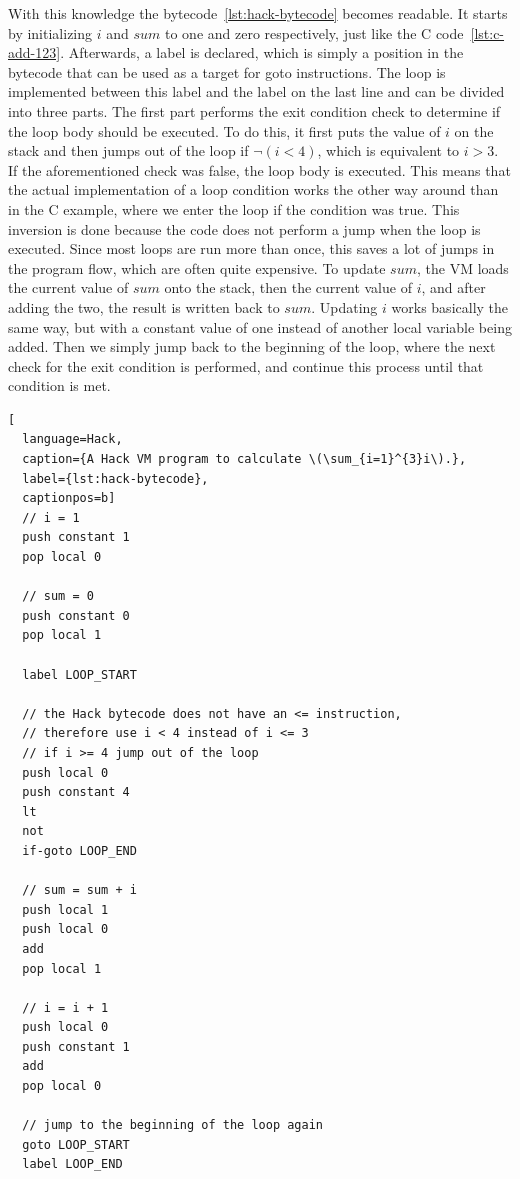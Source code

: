 With this knowledge the bytecode~\ref{lst:hack-bytecode} becomes readable.
It starts by initializing \(i\) and \(sum\) to one and zero respectively, just like the C code~\ref{lst:c-add-123}.
Afterwards, a label is declared, which is simply a position in the bytecode that can be used as a target for goto instructions.
The loop is implemented between this label and the label on the last line and can be divided into three parts.
The first part performs the exit condition check to determine if the loop body should be executed.
To do this, it first puts the value of \(i\) on the stack and then jumps out of the loop if \(\neg(i < 4)\), which is equivalent to \(i > 3\).
If the aforementioned check was false, the loop body is executed.
This means that the actual implementation of a loop condition works the other way around than in the C example, where we enter the loop if the condition was true.
This inversion is done because the code does not perform a jump when the loop is executed.
Since most loops are run more than once, this saves a lot of jumps in the program flow, which are often quite expensive.
To update \(sum\), the VM loads the current value of \(sum\) onto the stack, then the current value of \(i\), and after adding the two, the result is written back to \(sum\).
Updating \(i\) works basically the same way, but with a constant value of one instead of another local variable being added.
Then we simply jump back to the beginning of the loop, where the next check for the exit condition is performed, and continue this process until that condition is met.

\begin{lstlisting}[
  language=Hack,
  caption={A Hack VM program to calculate \(\sum_{i=1}^{3}i\).},
  label={lst:hack-bytecode},
  captionpos=b]
  // i = 1
  push constant 1
  pop local 0

  // sum = 0
  push constant 0
  pop local 1

  label LOOP_START

  // the Hack bytecode does not have an <= instruction,
  // therefore use i < 4 instead of i <= 3
  // if i >= 4 jump out of the loop
  push local 0
  push constant 4
  lt
  not
  if-goto LOOP_END

  // sum = sum + i
  push local 1
  push local 0
  add
  pop local 1

  // i = i + 1
  push local 0
  push constant 1
  add
  pop local 0

  // jump to the beginning of the loop again
  goto LOOP_START
  label LOOP_END
\end{lstlisting}

